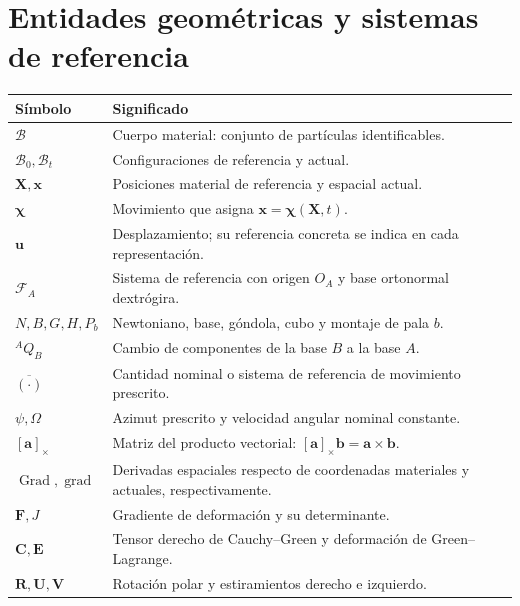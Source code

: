 \documentclass[11pt,a4paper,oneside]{report}
\newcommand{\vct}[1]{\bm{#1}}
\newcommand{\ten}[1]{\boldsymbol{#1}}
\newcommand{\Grad}{\operatorname{Grad}}
\newcommand{\grad}{\operatorname{grad}}
\begin{document}
\section{Entidades geométricas y sistemas de referencia}
\begin{longtable}{p{}p{}}
\toprule Símbolo & Significado \\\midrule\endhead
$\mathcal B$ & Cuerpo material: conjunto de partículas identificables.\\
$\mathcal B_0,\mathcal B_t$ & Configuraciones de referencia y actual.\\
$\vct X,\vct x$ & Posiciones material de referencia y espacial actual.\\
$\vct\chi$ & Movimiento que asigna $\vct x=\vct\chi(\vct X,t)$.\\
$\vct u$ & Desplazamiento; su referencia concreta se indica en cada representación.\\
$\mathcal F_A$ & Sistema de referencia con origen $O_A$ y base ortonormal dextrógira.\\
$N,B,G,H,P_b$ & Newtoniano, base, góndola, cubo y montaje de pala $b$.\\
${}^AQ_B$ & Cambio de componentes de la base $B$ a la base $A$.\\
$\overline{(\cdot)}$ & Cantidad nominal o sistema de referencia de movimiento prescrito.\\
$\psi,\Omega$ & Azimut prescrito y velocidad angular nominal constante.\\
$[\vct a]_\times$ & Matriz del producto vectorial: $[\vct a]_\times\vct b=\vct a\times\vct b$.\\
$\Grad,\grad$ & Derivadas espaciales respecto de coordenadas materiales y actuales, respectivamente.\\
$\ten F,J$ & Gradiente de deformación y su determinante.\\
$\ten C,\ten E$ & Tensor derecho de Cauchy--Green y deformación de Green--Lagrange.\\
$\ten R,\ten U,\ten V$ & Rotación polar y estiramientos derecho e izquierdo.\\
\bottomrule
\end{longtable}
\end{document}
